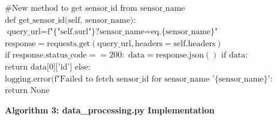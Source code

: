 \begin{algorithmic}[1]
\STATE
\STATE \hspace{0.5cm} $\text{\# New method to get sensor\_id from sensor\_name}$
\STATE \hspace{0.5cm} $\text{def get\_sensor\_id(self, sensor\_name):}$
\STATE \hspace{1.0cm} $\text{query\_url} = \text{f"\{"self.surl"\}?sensor\_name=eq.\{sensor\_name\}"}$
\STATE \hspace{1.0cm} $\text{response} = \text{requests.get}(\text{query\_url}, \text{headers} = \text{self.headers})$
\STATE \hspace{1.0cm} $\text{if response.status\_code} == 200:$
\STATE \hspace{1.5cm} $\text{data} = \text{response.json}()$
\STATE \hspace{1.5cm} $\text{if data:}$
\STATE \hspace{2.0cm} $\text{return data[0]['id']}$
\STATE \hspace{1.0cm} $\text{else:}$
\STATE \hspace{1.5cm} $\text{logging.error(f"Failed to fetch sensor\_id for sensor\_name '\{sensor\_name\}': \{response.status\_code\} - \{response.text\}")}$
\STATE \hspace{1.0cm} $\text{return None}$
\end{algorithmic}

\clearpage




\noindent\textbf{Algorithm 3: data\_processing.py Implementation}

